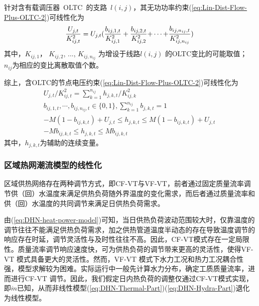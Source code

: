 针对含有载调压器~OLTC~的支路~$l(i,j)$，其无功功率约束(\ref{eq:Lin-Dist-Flow-Plus-OLTC-2})可线性化为
\begin{equation}
\label{eq:OLTC-approxi-1}
\frac{{{U_{j,t}}}}{{K_{ij,t}^2}} = {U_{j,t}}({\frac{{{b_{ij,1,t}}}}{{K_{ij,1}^2}} + \frac{{{b_{ij,2,t}}}}{{K_{ij,2}^2}}{\rm{ + }} \cdots {\rm{ + }}\frac{{{b_{ij,{n_{ij}},t}}}}{{K_{ij,{n_{ij}}}^2}}})
\end{equation}
其中，$K_{ij,1}^{}$， $K_{ij,2}^{}$, ..., $K_{ij,{n_{ij}}}^{}$ 为增设于线路$l(i,j)$ 的OLTC变比的可能取值；${n_{ij}}$为相应的变比离散取值个数。

综上，含OLTC的节点电压约束(\ref{eq:Lin-Dist-Flow-Plus-OLTC-2})可线性化为\cite{PDN-Model-Reactive-Power-14, PDN-Model-Reactive-Power-DT-16, CAES-IES-16-Rui}
\begin{subequations}
\label{eq:OLTC-approxi-2}
\begin{gather}
{{U_{j,t}}/K_{ij,t}^2 = \sum\limits_{k = 1}^{{n_{ij}}} {{h_{j,k,t}}/K_{ij,k}^2} }\\
{{b_{ij,1,t}}, \cdots ,{b_{ij,{n_{ij}},t}} \in \{ 0,1\} ,\sum\limits_{k = 1}^{{n_{ij}}} {{b_{j,k,t}}}  = 1}\\
{ - M({1 - {b_{ij,k,t}}}) + {U_{j,t}} \le {h_{j,k,t}} \le M({1 - {b_{ij,k,t}}}) + {U_{j,t}}}\\
{ - M{b_{ij,k,t}} \le {h_{j,k,t}} \le M{b_{ij,k,t}}}
\end{gather}
\end{subequations}
其中，$h_{j,k,t}$为辅助的连续变量。

\subsubsection{区域热网潮流模型的线性化}

区域供热网络存在两种调节方式，即CF-VT与VF-VT\cite{DHN-CFVT-2013}，前者通过固定质量流率调节供（回）水温度来满足供热负荷随外界温度的变化需求，而后者通过质量流率和供（回）水温度的共同调节来满足日供热负荷需求。

由(\ref{eq:DHN-heat-power-model})可知，当日供热负荷波动范围较大时，仅靠温度的调节往往不能满足供热负荷需求，加之供热管道温度半动态的存在导致温度调节的响应存在时延\cite{IES-DHN-16-LZG}，调节灵活性与及时性往往不高。因此，CF-VT模式存在一定局限性。质量流率调节响应速度快，可为供热负荷的调节带来更高的灵活性，使得VF-VT 模式具备更大的灵活性。然而，VF-VT 模式下水力工况和热力工况耦合性强，模型求解较为困难。实际运行中一般先计算水力分布，确定工质质量流率，进而进行CF-VT 调节。因此，我们假定日内热负荷的调整仅通过CF-VT模式实现，即$\dot m$已知，从而非线性模型(\ref{eq:DHN-Thermal-Part})(\ref{eq:DHN-Hydra-Part})退化为线性模型。

